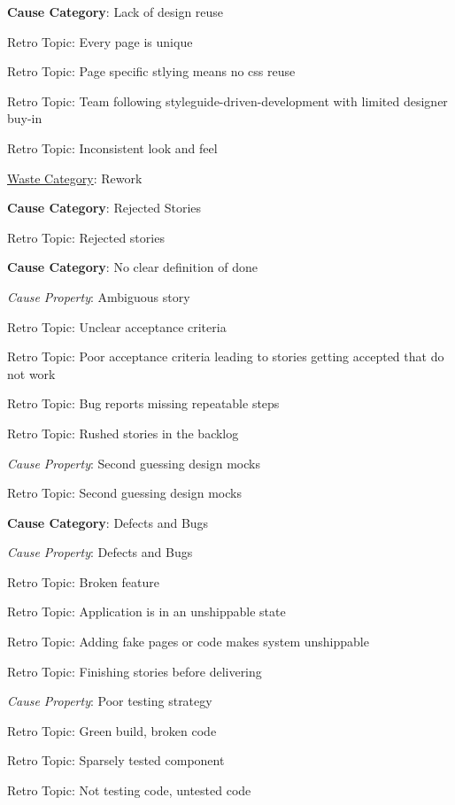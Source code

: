 \quad \textbf{Cause Category}: Lack of design reuse

\quad \quad Retro Topic: Every page is unique

\quad \quad Retro Topic: Page specific stlying means no css reuse

\quad \quad Retro Topic: Team following styleguide-driven-development with limited designer buy-in

\quad \quad Retro Topic: Inconsistent look and feel



\underline{Waste Category}: Rework

\quad \textbf{Cause Category}: Rejected Stories

\quad \quad Retro Topic: Rejected stories

\quad \textbf{Cause Category}: No clear definition of done

\quad \quad \textit{Cause Property}: Ambiguous story

\quad \quad \quad Retro Topic: Unclear acceptance criteria

\quad \quad \quad Retro Topic: Poor acceptance criteria leading to stories getting accepted that do not work

\quad \quad \quad Retro Topic: Bug reports missing repeatable steps

\quad \quad \quad Retro Topic: Rushed stories in the backlog

\quad \quad \textit{Cause Property}: Second guessing design mocks

\quad \quad \quad Retro Topic: Second guessing design mocks

\quad \textbf{Cause Category}: Defects and Bugs

\quad \quad \textit{Cause Property}: Defects and Bugs

\quad \quad \quad Retro Topic: Broken feature

\quad \quad \quad Retro Topic: Application is in an unshippable state

\quad \quad \quad Retro Topic: Adding fake pages or code makes system unshippable

\quad \quad \quad Retro Topic: Finishing stories before delivering

\quad \quad \textit{Cause Property}: Poor testing strategy

\quad \quad \quad Retro Topic: Green build, broken code

\quad \quad \quad Retro Topic: Sparsely tested component

\quad \quad \quad Retro Topic: Not testing code, untested code

